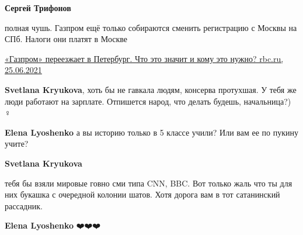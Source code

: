 \begin{itemize}
\begin{itemize}
\textbf{Сергей Трифонов} 

полная чушь. Газпром ещё только собираются сменить регистрацию с Москвы на СПб.
Налоги они платят в Москве

\href{https://www.rbc.ru/spb_sz/25/06/2021/60d5d8099a7947a1db2da695}{%
«Газпром» переезжает в Петербург. Что это значит и кому это нужно? rbc.ru, 25.06.2021}

 
\textbf{Svetlana Kryukova}, хоть бы не гавкала людям, консерва протухшая. У тебя же люди работают на зарплате. Отпишется народ, что делать будешь, начальница?)🤦🏼♀️

 
\textbf{Elena Lyoshenko} а вы историю только в 5 классе учили? Или вам ее по пукину учите?

 
\textbf{Svetlana Kryukova} 

тебя бы взяли мировые говно сми типа CNN, BBC. Вот только жаль что ты для них
букашка с очередной колонии шатов. Хотя дорога вам в тот сатанинский рассадник.


 
\textbf{Elena Lyoshenko} ❤️❤️❤️

\end{itemize}

\end{itemize}

